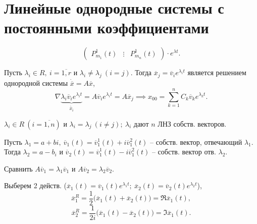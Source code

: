 

\section{Линейные однородные системы с постоянными коэффициентами}

\[
	\left(\begin{array}{c}
			P_{m_1}^{1} (t) & \vdots & P_{m_n}^{1} (t)
		\end{array}\right) \cdot e^{\lambda t} .
\]

\begin{note}[Случай 1]
	Пусть $\lambda _i \in R, \ i = \overline{1,r} $ и $\lambda _i \ne \lambda _j \ (i = j)$. Тогда $\overline{x} _j = \overline{v} _i e^{\lambda _i t} $ является решением однородной системы $\dot{\overline{x} } = A \overline{x} $,
	\[
		\nabla \underbrace{\lambda _i \overline{v} _i e^{\lambda _i t}}_{\dot{\overline{x} _i}} = A \overline{v} _i e^{\lambda _i t} = A \overline{x} _j \implies x_{00} = \sum_{k=1}^{n} C_k \overline{v} _k e^{\lambda _k t} .
	\]
\end{note}

\begin{remark}
	$\lambda _i \in R \ (i = \overline{1,n} )$ и $\lambda _i = \lambda _j \ (i \ne j) ; \ \lambda _i $ дают $n$ ЛНЗ собств. векторов.
\end{remark}

\begin{note}[Случай 2]
	Пусть $\lambda _1 = a + bi, \ \overline{v} _1(t) = \overline{v}_{1}^{1} (t) + i \overline{v}_{1}^{2} (t)$ -- собств. вектор, отвечающий $\lambda _1$. Тогда $\lambda _2 = a - b_i $ и $\overline{v} _2 (t) = \overline{v}_{1}^{1} (t) - i \overline{v}_{1}^{2} (t)$ -- собств. вектор отв. $\lambda _2$.

	Сравнить $A \overline{v}_1 = \lambda_1 \overline{v}_1$ и $A \overline{v} _2 = \lambda _2 \overline{v} _2$.

	Выберем 2 действ. ($\overline{x} _1 (t) = \overline{v} _1 (t) e^{\lambda _1 t} ; \ \overline{x} _2 (t) = \overline{v}_2(t)e^{\lambda _2 t} $),
	\[
		\overline{x}_{1}^{R} = \frac{1}{2} \big(\overline{x} _1(t) + \overline{x} _2(t)\big) = \Re \overline{x} _1 (t),
	\]
	\[
		\overline{x}_{2}^{R} = \frac{1}{2i} \big(\overline{x} _1 (t) - \overline{x} _2(t)\big) = \Im \overline{x} _1 (t).
	\]
\end{note}


